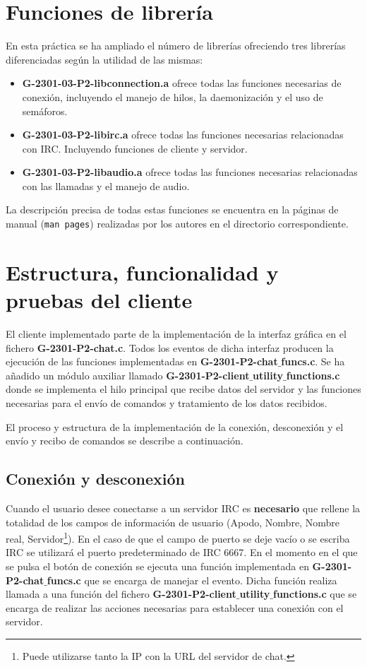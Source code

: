 \documentclass{mathnotes}
\begin{document}
\section{Funciones de librería}
En esta práctica se ha ampliado el número de librerías ofreciendo tres librerías diferenciadas según la utilidad de las mismas:

\begin{itemize}
\item \textbf{G-2301-03-P2-libconnection.a} ofrece todas las funciones necesarias de conexión, incluyendo el manejo de hilos, la daemonización y el uso de semáforos.

\item \textbf{G-2301-03-P2-libirc.a} ofrece todas las funciones necesarias relacionadas con IRC. Incluyendo funciones de cliente y servidor.

\item \textbf{G-2301-03-P2-libaudio.a} ofrece todas las funciones necesarias relacionadas con las llamadas y el manejo de audio.
\end{itemize}

La descripción precisa de todas estas funciones se encuentra en la páginas de manual (\texttt{man pages}) realizadas por los autores en el directorio correspondiente.

\section{Estructura, funcionalidad y pruebas del cliente}

El cliente implementado parte de la implementación de la interfaz gráfica en el fichero \textbf{G-2301-P2-chat.c}. Todos los eventos de dicha interfaz producen la ejecución de las funciones implementadas en \textbf{G-2301-P2-chat$\_$funcs.c}. Se ha añadido un módulo auxiliar llamado \textbf{G-2301-P2-client$\_$utility$\_$functions.c} donde se implementa el hilo principal que recibe datos del servidor y las funciones necesarias para el envío de comandos y tratamiento de los datos recibidos.

El proceso y estructura de la implementación de la conexión, desconexión y el envío y recibo de comandos se describe a continuación.

\subsection{Conexión y desconexión}
Cuando el usuario desee conectarse a un servidor IRC es \textbf{necesario} que rellene la totalidad de los campos de información de usuario (Apodo, Nombre, Nombre real, Servidor\footnote{Puede utilizarse tanto la IP con la URL del servidor de chat.}). En el caso de que el campo de puerto se deje vacío o se escriba IRC se utilizará el puerto predeterminado de IRC 6667. En el momento en el que se pulsa el botón de conexión se ejecuta una función implementada en \textbf{G-2301-P2-chat$\_$funcs.c} que se encarga de manejar el evento. Dicha función realiza llamada a una función del fichero \textbf{G-2301-P2-client$\_$utility$\_$functions.c} que se encarga de realizar las acciones necesarias para establecer una conexión con el servidor.
\end{document}
